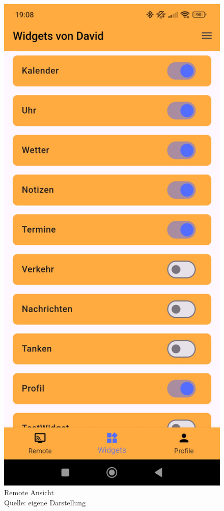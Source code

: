 \begin{figure}[h]
\begin{minipage}[b]{0.25\textwidth}
        \captionsetup{justification=centering, labelformat=simple, singlelinecheck=false}
        \caption{Remote Ansicht\\ Quelle: eigene Darstellung}
    \end{minipage}
    \hfill
    \begin{minipage}[b]{0.25\textwidth}
        \centering
        \includegraphics[width=\textwidth]{pictures/remote_widgets.jpg}

\end{minipage}
\end{figure}
